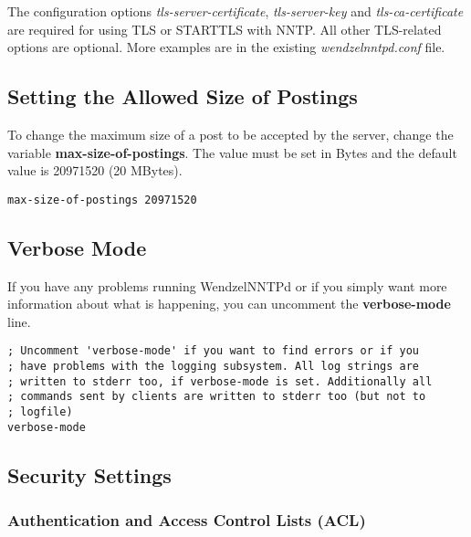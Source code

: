 \documentclass[12pt,fleqn,leqno]{scrbook}
\begin{document}
The configuration options \emph{tls-server-certificate},
\emph{tls-server-key} and \emph{tls-ca-certificate} are required for
using TLS or STARTTLS with NNTP. All other TLS-related options are
optional. More examples are in the existing \emph{wendzelnntpd.conf}
file.

\hypertarget{setting-the-allowed-size-of-postings-1}{%
\subsection{Setting the Allowed Size of
Postings}\label{setting-the-allowed-size-of-postings-1}}

To change the maximum size of a post to be accepted by the server,
change the variable \textbf{max-size-of-postings}. The value must be set
in Bytes and the default value is 20971520 (20 MBytes).

\begin{verbatim}
max-size-of-postings 20971520
\end{verbatim}

\hypertarget{verbose-mode-1}{%
\subsection{Verbose Mode}\label{verbose-mode-1}}

If you have any problems running WendzelNNTPd or if you simply want more
information about what is happening, you can uncomment the
\textbf{verbose-mode} line.

\begin{verbatim}
; Uncomment 'verbose-mode' if you want to find errors or if you
; have problems with the logging subsystem. All log strings are
; written to stderr too, if verbose-mode is set. Additionally all
; commands sent by clients are written to stderr too (but not to
; logfile)
verbose-mode
\end{verbatim}

\hypertarget{security-settings-1}{%
\subsection{Security Settings}\label{security-settings-1}}

\hypertarget{authentication-and-access-control-lists-acl-1}{%
\subsubsection{Authentication and Access Control Lists
(ACL)}\label{authentication-and-access-control-lists-acl-1}}
\end{document}
